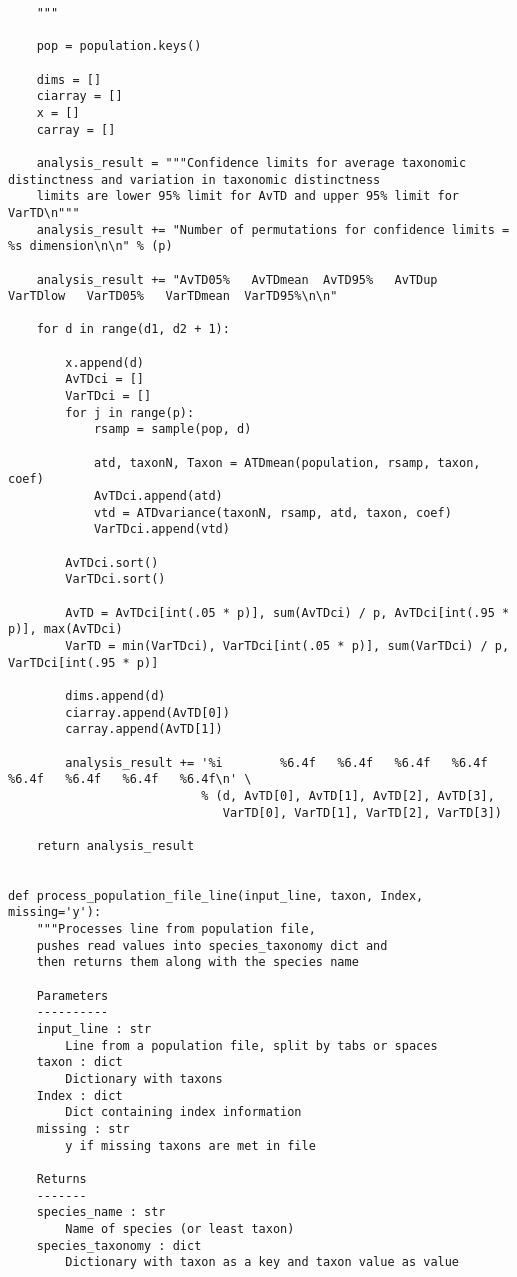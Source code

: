 \documentclass[a4paper,11pt]{article}
\begin{document}
\begin{lstlisting}
    """

    pop = population.keys()

    dims = []
    ciarray = []
    x = []
    carray = []

    analysis_result = """Confidence limits for average taxonomic distinctness and variation in taxonomic distinctness
    limits are lower 95% limit for AvTD and upper 95% limit for VarTD\n"""
    analysis_result += "Number of permutations for confidence limits = %s dimension\n\n" % (p)

    analysis_result += "AvTD05%   AvTDmean  AvTD95%   AvTDup    VarTDlow   VarTD05%   VarTDmean  VarTD95%\n\n"

    for d in range(d1, d2 + 1):

        x.append(d)
        AvTDci = []
        VarTDci = []
        for j in range(p):
            rsamp = sample(pop, d)

            atd, taxonN, Taxon = ATDmean(population, rsamp, taxon, coef)
            AvTDci.append(atd)
            vtd = ATDvariance(taxonN, rsamp, atd, taxon, coef)
            VarTDci.append(vtd)

        AvTDci.sort()
        VarTDci.sort()

        AvTD = AvTDci[int(.05 * p)], sum(AvTDci) / p, AvTDci[int(.95 * p)], max(AvTDci)
        VarTD = min(VarTDci), VarTDci[int(.05 * p)], sum(VarTDci) / p, VarTDci[int(.95 * p)]

        dims.append(d)
        ciarray.append(AvTD[0])
        carray.append(AvTD[1])

        analysis_result += '%i        %6.4f   %6.4f   %6.4f   %6.4f   %6.4f   %6.4f   %6.4f   %6.4f\n' \
                           % (d, AvTD[0], AvTD[1], AvTD[2], AvTD[3],
                              VarTD[0], VarTD[1], VarTD[2], VarTD[3])

    return analysis_result


def process_population_file_line(input_line, taxon, Index, missing='y'):
    """Processes line from population file,
    pushes read values into species_taxonomy dict and
    then returns them along with the species name

    Parameters
    ----------
    input_line : str
        Line from a population file, split by tabs or spaces
    taxon : dict
        Dictionary with taxons
    Index : dict
        Dict containing index information
    missing : str
        y if missing taxons are met in file

    Returns
    -------
    species_name : str
        Name of species (or least taxon)
    species_taxonomy : dict
        Dictionary with taxon as a key and taxon value as value


\end{lstlisting}
\end{document}
